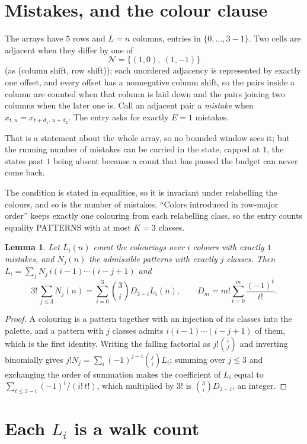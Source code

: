 \documentclass[11pt,a4paper]{article}
\theoremstyle{plain}
\newtheorem{lemma}[theorem]{Lemma}
\theoremstyle{definition}
\begin{document}
\section{Mistakes, and the colour clause}

The arrays have $5$ rows and $L=n$ columns, entries in $\{0,\dots,3-1\}$.
Two cells are adjacent when they differ by one of
\[
\mathcal N=\{(1,0),\ (1,-1)\}
\]
(as (column shift, row shift)); each unordered adjacency is represented by exactly one
offset, and every offset has a nonnegative column shift, so the pairs inside a column are
counted when that column is laid down and the pairs joining two columns when the later one
is. Call an adjacent pair a \emph{mistake} when $x_{t,u}=x_{t+d_1,\,u+d_2}$. The entry asks for exactly
$E=1$ mistakes.

That is a statement about the whole array, so no bounded window sees it; but the running
number of mistakes can be carried in the state, capped at $1$, the states past $1$ being
absent because a count that has passed the budget can never come back.

The condition is stated in equalities, so it is invariant under relabelling the colours, and
so is the number of mistakes. ``Colors introduced in row-major order'' keeps exactly one
colouring from each relabelling class, so the entry counts equality PATTERNS with at most
$K=3$ classes.

\begin{lemma}\label{lem:inv}
Let $L_i(n)$ count the colourings over $i$ colours with exactly $1$ mistakes, and $N_j(n)$
the admissible patterns with exactly $j$ classes. Then
$L_i=\sum_j N_j\,i(i-1)\cdots(i-j+1)$ and
\[
3!\,\sum_{j\le3}N_j(n)=\sum_{i=0}^{3}\binom{3}{i}D_{3-i}L_i(n),
\qquad D_m=m!\sum_{t=0}^{m}\frac{(-1)^t}{t!} .
\]
\end{lemma}

\begin{proof}
A colouring is a pattern together with an injection of its classes into the palette, and a
pattern with $j$ classes admits $i(i-1)\cdots(i-j+1)$ of them, which is the first identity.
Writing the falling factorial as $j!\binom{i}{j}$ and inverting binomially gives
$j!N_j=\sum_i(-1)^{j-i}\binom{j}{i}L_i$; summing over $j\le3$ and exchanging the order
of summation makes the coefficient of $L_i$ equal to $\sum_{t\le3-i}(-1)^t/(i!\,t!)$,
which multiplied by $3!$ is $\binom{3}{i}D_{3-i}$, an integer.
\end{proof}

\section{Each $L_i$ is a walk count}
\end{document}
